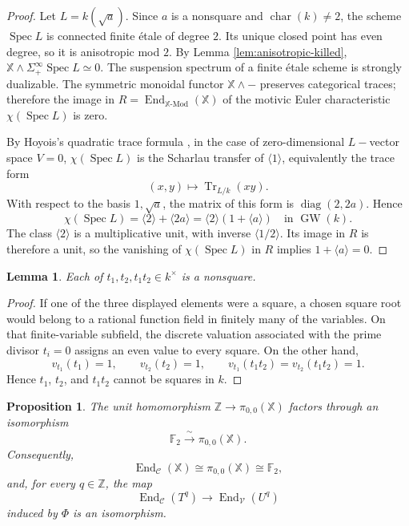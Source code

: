 \documentclass[11pt]{amsart}
\numberwithin{equation}{section}
\newtheorem{proposition}[theorem]{Proposition}
\newtheorem{lemma}[theorem]{Lemma}
\theoremstyle{definition}
\theoremstyle{remark}
\DeclareMathOperator{\End}{End}
\DeclareMathOperator{\Spec}{Spec}
\DeclareMathOperator{\GW}{GW}
\newcommand{\F}{\mathbb F_2}
\newcommand{\X}{\mathbb X}
\newcommand{\C}{\mathcal C}
\newcommand{\V}{\mathcal V}
\newcommand{\Mod}{\mathrm{Mod}}
\begin{document}
\begin{proof}
Let $L=k(\sqrt a)$.  Since $a$ is a nonsquare and
$\operatorname{char}(k)\ne2$, the scheme $\Spec L$ is connected finite
\'etale of degree $2$.  Its unique closed point has even degree, so it is
anisotropic mod $2$.  By Lemma \ref{lem:anisotropic-killed},
$\X\wedge\Sigma^\infty_+\Spec L\simeq0.$ The suspension spectrum of a finite \'etale scheme is strongly dualizable.
The symmetric monoidal functor $\X\wedge-$ preserves categorical traces;
therefore the image in $R=\End_{\X\text{-}\Mod}(\X)$ of the motivic Euler
characteristic $\chi(\Spec L)$ is zero.

By Hoyois's quadratic trace formula
\cite[Theorem~1.9]{HoyoisTrace}, in the case of zero-dimensional $L-$vector space $V=0$,
$\chi(\Spec L)$ is the Scharlau transfer of
$\langle1\rangle$, equivalently the trace form
\[
  (x,y)\longmapsto\operatorname{Tr}_{L/k}(xy).
\]
With respect to the basis $1,\sqrt a$, the matrix of this form is
$\operatorname{diag}(2,2a)$.  Hence
\[
  \chi(\Spec L)=\langle2\rangle+\langle2a\rangle
  =\langle2\rangle(1+\langle a\rangle)
  \quad\text{in }\GW(k).
\]
The class $\langle2\rangle$ is a multiplicative unit, with inverse
$\langle1/2\rangle$.  Its image in $R$ is therefore a unit, so the vanishing
of $\chi(\Spec L)$ in $R$ implies
$1+\langle a\rangle=0$.
\end{proof}

\begin{lemma}\label{lem:three-nonsquares}
Each of $t_1,t_2,t_1t_2\in k^\times$ is a nonsquare.
\end{lemma}

\begin{proof}
If one of the three displayed elements were a square, a chosen square root
would belong to a rational function field in finitely many of the variables.
On that finite-variable subfield, the discrete valuation associated with the
prime divisor $t_i=0$ assigns an even value to every square.  On the other
hand,
\[
  v_{t_1}(t_1)=1,\qquad
  v_{t_2}(t_2)=1,\qquad
  v_{t_1}(t_1t_2)=v_{t_2}(t_1t_2)=1.
\]
Hence $t_1$, $t_2$, and $t_1t_2$ cannot be squares in $k$.
\end{proof}

\begin{proposition}\label{prop:end-unit}
The unit homomorphism $\mathbb Z\to\pi_{0,0}(\X)$ factors through an
isomorphism
\[
  \F\xrightarrow{\,\sim\,}\pi_{0,0}(\X).
\]
Consequently,
\[
  \End_{\C}(\X)\cong\pi_{0,0}(\X)\cong\F,
\]
and, for every $q\in\mathbb Z$, the map
\[
  \End_{\C}(T^q)\longrightarrow\End_{\V}(U^q)
\]
induced by $\Phi$ is an isomorphism.
\end{proposition}
\end{document}
